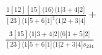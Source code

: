 \documentclass[varwidth, border=5pt]{standalone}
\begin{document}
\begin{my}
$\begin{gathered}
\scriptscriptstyle\frac{1[12][15]⟨16⟩⟨1|3+4|2]}{[23]⟨1|5+6|1]^2⟨1|2+3|4]}+\\
\scriptscriptstyle\frac{3[15]⟨1|3+4|2]⟨6|1+5|2]}{[23]⟨1|5+6|1]⟨1|2+3|4]s_{234}}\phantom{+}
\end{gathered}$
\end{my}
\end{document}

